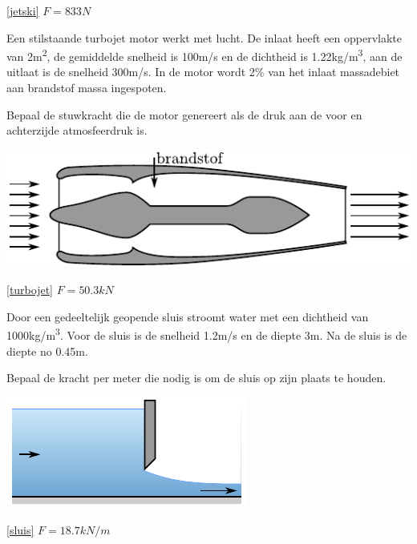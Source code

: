 \begin{antwoord}{\ref{jetski}}
	$F = 833\unit{N}$
\end{antwoord}
\begin{toepassing}
	\label{turbojet}
Een stilstaande turbojet motor werkt met lucht. De inlaat heeft een oppervlakte van 2\unit{m^2}, de gemiddelde snelheid is 100m/s en de dichtheid is 1.22\unit{kg/m^3}, aan de uitlaat is de snelheid 300m/s. In de motor wordt 2\% van het inlaat massadebiet aan brandstof massa ingespoten.

Bepaal de stuwkracht die de motor genereert als de druk aan de voor en achterzijde atmosfeerdruk is.

	\centering
	\includegraphics{fig/behoudsvergelijkingen/turbojet}
\end{toepassing}
\begin{antwoord}{\ref{turbojet}}
	$F = 50.3\unit{kN}$
\end{antwoord}
\begin{toepassing}
	\label{sluis}
Door een gedeeltelijk geopende sluis stroomt water met een dichtheid van 1000\unit{kg/m^3}. Voor de sluis is de snelheid 1.2m/s en de diepte 3m. Na de sluis is de diepte no 0.45m.

Bepaal de kracht per meter die nodig is om de sluis op zijn plaats te houden.

	\centering
	\includegraphics{fig/behoudsvergelijkingen/sluis}
\end{toepassing}
\begin{antwoord}{\ref{sluis}}
	$F = 18.7\unit{kN/m}$
\end{antwoord}
